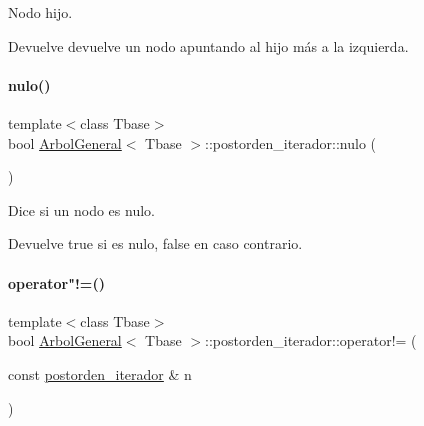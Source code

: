 Nodo hijo. 

\begin{DoxyReturn}{Devuelve}
devuelve un nodo apuntando al hijo más a la izquierda. 
\end{DoxyReturn}
\hypertarget{classArbolGeneral_1_1postorden__iterador_a68390390c83bf6e26d9ea74d547f1b2c}{}\label{classArbolGeneral_1_1postorden__iterador_a68390390c83bf6e26d9ea74d547f1b2c} 
\paragraph{\texorpdfstring{nulo()}{nulo()}}
{\footnotesize\ttfamily template$<$class Tbase$>$ \\
bool \hyperlink{classArbolGeneral}{Arbol\+General}$<$ Tbase $>$\+::postorden\+\_\+iterador\+::nulo (\begin{DoxyParamCaption}{ }\end{DoxyParamCaption})\hspace{0.3cm}{\ttfamily [inline]}}



Dice si un nodo es nulo. 

\begin{DoxyReturn}{Devuelve}
true si es nulo, false en caso contrario. 
\end{DoxyReturn}
\hypertarget{classArbolGeneral_1_1postorden__iterador_a15ce3ad6eded0487e0b2b5a49abde5ce}{}\label{classArbolGeneral_1_1postorden__iterador_a15ce3ad6eded0487e0b2b5a49abde5ce} 
\paragraph{\texorpdfstring{operator"!=()}{operator!=()}}
{\footnotesize\ttfamily template$<$class Tbase$>$ \\
bool \hyperlink{classArbolGeneral}{Arbol\+General}$<$ Tbase $>$\+::postorden\+\_\+iterador\+::operator!= (\begin{DoxyParamCaption}\item[{const \hyperlink{classArbolGeneral_1_1postorden__iterador}{postorden\+\_\+iterador} \&}]{n }\end{DoxyParamCaption})\hspace{0.3cm}{\ttfamily [inline]}}




